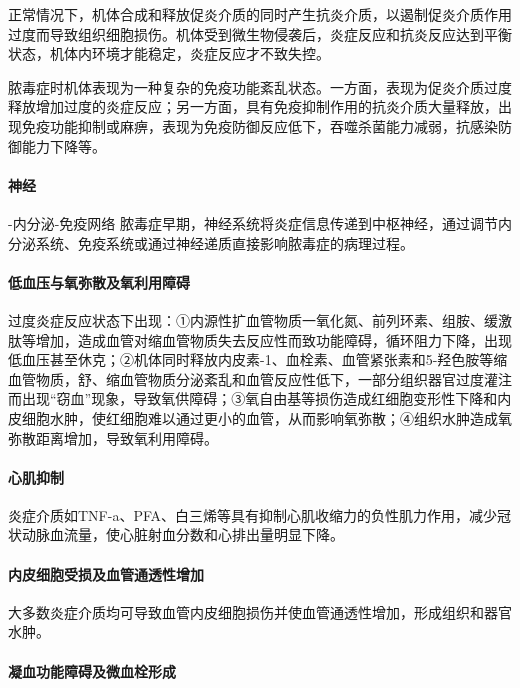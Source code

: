 正常情况下，机体合成和释放促炎介质的同时产生抗炎介质，以遏制促炎介质作用过度而导致组织细胞损伤。机体受到微生物侵袭后，炎症反应和抗炎反应达到平衡状态，机体内环境才能稳定，炎症反应才不致失控。

脓毒症时机体表现为一种复杂的免疫功能紊乱状态。一方面，表现为促炎介质过度释放增加过度的炎症反应；另一方面，具有免疫抑制作用的抗炎介质大量释放，出现免疫功能抑制或麻痹，表现为免疫防御反应低下，吞噬杀菌能力减弱，抗感染防御能力下降等。

\paragraph{神经}

-内分泌-免疫网络
脓毒症早期，神经系统将炎症信息传递到中枢神经，通过调节内分泌系统、免疫系统或通过神经递质直接影响脓毒症的病理过程。

\paragraph{低血压与氧弥散及氧利用障碍}

过度炎症反应状态下出现：①内源性扩血管物质一氧化氮、前列环素、组胺、缓激肽等增加，造成血管对缩血管物质失去反应性而致功能障碍，循环阻力下降，出现低血压甚至休克；②机体同时释放内皮素-1、血栓素、血管紧张素和5-羟色胺等缩血管物质，舒、缩血管物质分泌紊乱和血管反应性低下，一部分组织器官过度灌注而出现“窃血”现象，导致氧供障碍；③氧自由基等损伤造成红细胞变形性下降和内皮细胞水肿，使红细胞难以通过更小的血管，从而影响氧弥散；④组织水肿造成氧弥散距离增加，导致氧利用障碍。

\paragraph{心肌抑制}

炎症介质如TNF-a、PFA、白三烯等具有抑制心肌收缩力的负性肌力作用，减少冠状动脉血流量，使心脏射血分数和心排出量明显下降。

\paragraph{内皮细胞受损及血管通透性增加}

大多数炎症介质均可导致血管内皮细胞损伤并使血管通透性增加，形成组织和器官水肿。

\paragraph{凝血功能障碍及微血栓形成}


